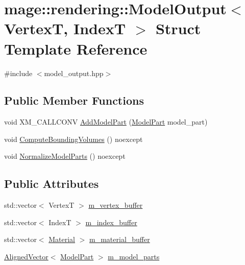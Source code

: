 \hypertarget{structmage_1_1rendering_1_1_model_output}{}\section{mage\+:\+:rendering\+:\+:Model\+Output$<$ VertexT, IndexT $>$ Struct Template Reference}
\label{structmage_1_1rendering_1_1_model_output}


{\ttfamily \#include $<$model\+\_\+output.\+hpp$>$}

\subsection*{Public Member Functions}
\begin{DoxyCompactItemize}
\item 
void X\+M\+\_\+\+C\+A\+L\+L\+C\+O\+NV \mbox{\hyperlink{structmage_1_1rendering_1_1_model_output_aa353983742bab0fe18c711dfd7e7502b}{Add\+Model\+Part}} (\mbox{\hyperlink{structmage_1_1rendering_1_1_model_part}{Model\+Part}} model\+\_\+part)
\item 
void \mbox{\hyperlink{structmage_1_1rendering_1_1_model_output_ad4b90961094b967a33fedd7e65a3f77a}{Compute\+Bounding\+Volumes}} () noexcept
\item 
void \mbox{\hyperlink{structmage_1_1rendering_1_1_model_output_aa94d284f71956ce69807916ff808d679}{Normalize\+Model\+Parts}} () noexcept
\end{DoxyCompactItemize}
\subsection*{Public Attributes}
\begin{DoxyCompactItemize}
\item 
std\+::vector$<$ VertexT $>$ \mbox{\hyperlink{structmage_1_1rendering_1_1_model_output_a397e9daee731bb89683daa68bd4acd0f}{m\+\_\+vertex\+\_\+buffer}}
\item 
std\+::vector$<$ IndexT $>$ \mbox{\hyperlink{structmage_1_1rendering_1_1_model_output_a0290ea3f7afa5022cedbc9bc316d24e0}{m\+\_\+index\+\_\+buffer}}
\item 
std\+::vector$<$ \mbox{\hyperlink{classmage_1_1rendering_1_1_material}{Material}} $>$ \mbox{\hyperlink{structmage_1_1rendering_1_1_model_output_a7d290dd28d6cef9f33eead6cf30f042f}{m\+\_\+material\+\_\+buffer}}
\item 
\mbox{\hyperlink{namespacemage_a8664bfb5ce2179fc64eae9f82c8a5ba8}{Aligned\+Vector}}$<$ \mbox{\hyperlink{structmage_1_1rendering_1_1_model_part}{Model\+Part}} $>$ \mbox{\hyperlink{structmage_1_1rendering_1_1_model_output_a18da9c959800d0331488351612e25df2}{m\+\_\+model\+\_\+parts}}
\end{DoxyCompactItemize}
